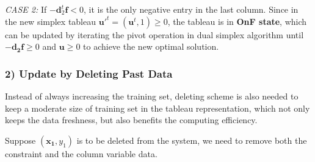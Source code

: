 \documentclass[letterpaper]{article}
\begin{document}
\emph{CASE 2:} If $-\mathbf{d}^t_2\mathbf{f} < 0$, it is the only negative entry in the last column. Since in the new simplex tableau $\mathbf{u}'^t = (\mathbf{u}^t, 1) \geq 0$,  the tableau is in \textbf{OnF state}, which can be updated by iterating the pivot operation in dual simplex algorithm until $\mathbf{-d_2f}\ge0$ and $\mathbf{u}\ge0$ to achieve the new optimal solution.



\subsubsection{2) Update by Deleting Past Data}
Instead of always increasing the training set, deleting scheme is also needed to keep a moderate size of training set in the tableau representation, which not only keeps the data freshness, but also benefits the computing efficiency.

Suppose $(\mathbf{x_1}, y_1)$ is to be deleted from the system, we need to remove both the constraint and the column variable data.
\end{document}
